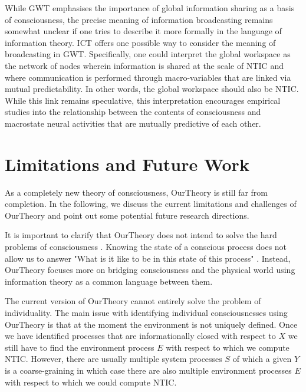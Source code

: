 \documentclass[utf8]{article}
\begin{document}
        While GWT emphasises the importance of global information sharing as a basis of consciousness, the precise meaning of information broadcasting remains somewhat unclear if one tries to describe it more formally in the language of information theory. ICT offers one possible way to consider the meaning of broadcasting in GWT. Specifically, one could interpret the global workspace as the network of nodes wherein information is shared at the scale of NTIC and where communication is performed through macro-variables that are linked via mutual predictability. In other words, the global workspace should also be NTIC. While this link remains speculative, this interpretation encourages empirical studies into the relationship between the contents of consciousness and macrostate neural activities that are mutually predictive of each other.
		

    \section{Limitations and Future Work}\label{sec:Limitation and Future work}  
        As a completely new theory of consciousness, \ac{OurTheory} is still far from completion. In the following, we discuss the current limitations and challenges of \ac{OurTheory} and point out some potential future research directions.
    
        
        It is important to clarify that \ac{OurTheory} does not intend to  solve the hard problems of consciousness \citep{chalmers1995facing}. Knowing the state of a conscious process does not allow us to answer "What is it like to be in this state of this process" \citep{nagel1974like}. Instead, \ac{OurTheory} focuses more on bridging consciousness and the physical world using information theory as a common language between them.
        
        The current version of \ac{OurTheory} cannot entirely solve the problem of individuality. The main issue with identifying individual consciousnesses using \ac{OurTheory} is that at the moment the environment is not uniquely defined. Once we have identified processes that are informationally closed with respect to $X$ we still have to find the environment process $E$ with respect to which we compute NTIC. However, there are usually multiple system processes $S$ of which a given $Y$ is a coarse-graining in which case there are also multiple environment processes $E$ with respect to which we could compute NTIC. 
        
\end{document}
